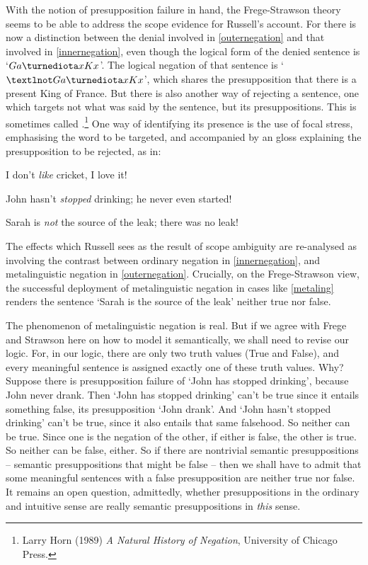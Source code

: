 With the notion of presupposition failure in hand, the Frege-Strawson theory seems to be able to address the scope evidence for Russell's account. For there is now a distinction between the denial involved in \ref{outernegation} and that involved in \ref{innernegation}, even though the logical form of the denied sentence is `$Ga\maththe x Kx$'. The logical negation of that sentence is `$¬Ga\maththe x Kx$', which shares the presupposition that there is a present King of France. But there is also another way of rejecting a sentence, one which targets not what was said by the sentence, but its presuppositions. This is sometimes called .\footnote{Larry Horn (1989) \emph{A Natural History of Negation}, University of Chicago Press.} One way of identifying its presence is the use of focal stress, emphasising the word to be targeted, and accompanied by an gloss explaining the presupposition to be rejected, as in:
\begin{earg}
\item[\ex{likelove}] I don't \emph{like} cricket, I love it!
\item[\ex{neverstarted}] John hasn't \emph{stopped} drinking; he never even started!
\item[\ex{metaling}] Sarah is \emph{not} the source of the leak; there was no leak!
\end{earg} The effects which Russell sees as the result of scope ambiguity are re-analysed as involving the contrast between ordinary negation in \ref{innernegation}, and metalinguistic negation in \ref{outernegation}. Crucially, on the Frege-Strawson view, the successful deployment of metalinguistic negation in cases like \ref{metaling} renders the sentence `Sarah is the source of the leak' neither true nor false.

The phenomenon of metalinguistic negation is real. But if we agree with Frege and Strawson here on how to model it semantically,  we shall need to revise our logic. For, in our logic, there are only two truth values (True and False), and every meaningful sentence is assigned exactly one of these truth values. Why? Suppose there is presupposition failure of `John has stopped drinking', because John never drank. Then `John has stopped drinking' can't be true since it entails something false, its presupposition `John drank'. And `John hasn't stopped drinking' can't be true, since it also entails that same falsehood. So neither can be true. Since one is the negation of the other, if either is false, the other is true. So neither can be false, either. So if there are nontrivial semantic presuppositions – semantic presuppositions that might be false – then we shall have to admit that some meaningful sentences with a false presupposition are neither true nor false. It remains an open question, admittedly, whether presuppositions in the ordinary and intuitive sense are really semantic presuppositions in \emph{this} sense. 

